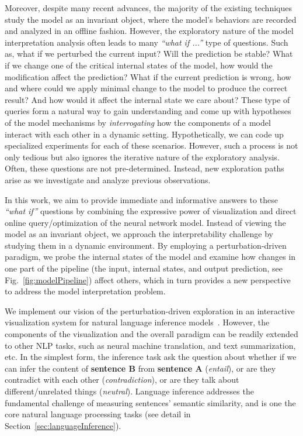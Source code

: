 Moreover, despite many recent advances, the majority of the existing techniques study the model as an invariant object, where the model's behaviors are recorded and analyzed in an offline fashion.
%
However, the exploratory nature of the model interpretation analysis often leads to many \emph{``what if ...''} type of questions. Such as, what if we perturbed the current input? Will the prediction be stable? What if we change one of the critical internal states of the model, how would the modification affect the prediction? What if the current prediction is wrong, how and where could we apply minimal change to the model to produce the correct result? And how would it affect the internal state we care about? These type of queries form a natural way to gain understanding and come up with hypotheses of the model mechanisms by \emph{interrogating} how the components of a model interact with each other in a dynamic setting. Hypothetically, we can code up specialized experiments for each of these scenarios. However, such a process is not only tedious but also ignores the iterative nature of the exploratory analysis. Often, these questions are not pre-determined. Instead, new exploration paths arise as we investigate and analyze previous observations.

In this work, we aim to provide immediate and informative answers to these \emph{``what if''} questions by combining the expressive power of visualization and direct online query/optimization of the neural network model. Instead of viewing the model as an invariant object, we approach the interpretability challenge by studying them in a dynamic environment. By employing a perturbation-driven paradigm, we probe the internal states of the model and examine how changes in one part of the pipeline (the input, internal states, and output prediction, see Fig.~\ref{fig:modelPipeline}) affect others, which in turn provides a new perspective to address the model interpretation problem.

We implement our vision of the perturbation-driven exploration in an interactive visualization system for natural language inference models~\cite{Parikh2016}.
However, the components of the visualization and the overall paradigm can be readily extended to other NLP tasks, such as neural machine translation, and text summarization, etc.
%
In the simplest form, the inference task ask the question about whether if we can infer the content of \textbf{sentence B} from \textbf{sentence A} (\emph{entail}), or are they contradict with each other (\emph{contradiction}), or are they talk about different/unrelated things (\emph{neutral}). Language inference addresses the fundamental challenge of measuring sentences' semantic similarity, and is one the core natural language processing tasks (see detail in Section~\ref{sec:languageInference}).

